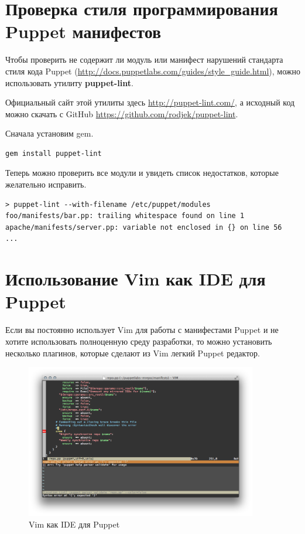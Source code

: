 \section{Проверка стиля программирования Puppet манифестов}

Чтобы проверить не содержит ли модуль или манифест нарушений стандарта стиля кода Puppet (\url{http://docs.puppetlabs.com/guides/style_guide.html}), можно использовать утилиту \textbf{puppet-lint}.

Официальный сайт этой утилиты здесь \url{http://puppet-lint.com/}, а исходный код можно скачать с GitHub \url{https://github.com/rodjek/puppet-lint}.

Сначала установим gem.

\begin{verbatim}
gem install puppet-lint
\end{verbatim}

Теперь можно проверить все модули и увидеть список недостатков, которые желательно исправить.

\begin{verbatim}
> puppet-lint --with-filename /etc/puppet/modules
foo/manifests/bar.pp: trailing whitespace found on line 1
apache/manifests/server.pp: variable not enclosed in {} on line 56
...
\end{verbatim}

\section{Использование Vim как IDE для Puppet}

Если вы постоянно использует Vim для работы с манифестами Puppet и не хотите использовать полноценную среду разработки, то можно установить несколько плагинов, которые сделают из Vim легкий Puppet редактор.

\begin{figure}[!ht]
\centering
\includegraphics[width=0.9\textwidth]{img/syntastic.png}
\caption{Vim как IDE для Puppet}
\label{fig:syntastic}
\end{figure}

